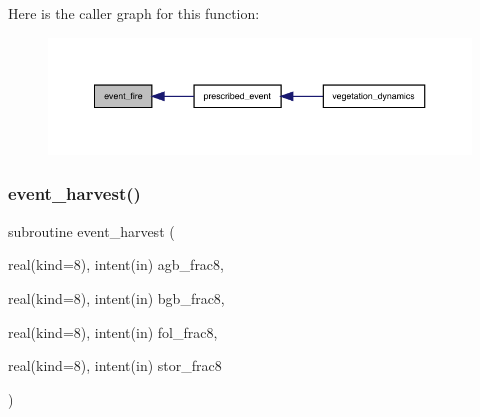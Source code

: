 Here is the caller graph for this function\+:
\nopagebreak
\begin{figure}[H]
\begin{center}
\leavevmode
\includegraphics[width=350pt]{events_8f90_af7863095b0112267385c3f252218c678_icgraph}
\end{center}
\end{figure}
\mbox{\label{events_8f90_ad9cbf1522be96cc9af2fbf80b1402d5c}} 
\subsubsection{\texorpdfstring{event\+\_\+harvest()}{event\_harvest()}}
{\footnotesize\ttfamily subroutine event\+\_\+harvest (\begin{DoxyParamCaption}\item[{real(kind=8), intent(in)}]{agb\+\_\+frac8,  }\item[{real(kind=8), intent(in)}]{bgb\+\_\+frac8,  }\item[{real(kind=8), intent(in)}]{fol\+\_\+frac8,  }\item[{real(kind=8), intent(in)}]{stor\+\_\+frac8 }\end{DoxyParamCaption})}

